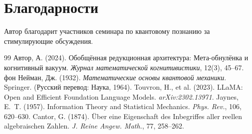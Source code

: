 \documentclass[11pt]{article}
\begin{document}
\section*{Благодарности}
Автор благодарит участников семинара по квантовому познанию за стимулирующие обсуждения.

\begin{thebibliography}{99}
 Автор, А. (2024). Обобщённая редукционная архитектура: Мета-обнулёнка и когнитивный вакуум. \textit{Журнал математической когнитивистики}, 12(3), 45--67.
 фон Нейман, Дж. (1932). \textit{Математические основы квантовой механики}. Springer. (Русский перевод: Наука, 1964).
 Touvron, H., et al. (2023). LLaMA: Open and Efficient Foundation Language Models. \textit{arXiv:2302.13971}.
 Jaynes, E.~T. (1957). Information Theory and Statistical Mechanics. \textit{Phys. Rev.}, 106, 620--630.
 Cantor, G. (1874). \"Uber eine Eigenschaft des Inbegriffes aller reellen algebraischen Zahlen. \textit{J. Reine Angew. Math.}, 77, 258--262.
\end{thebibliography}
\end{document}
